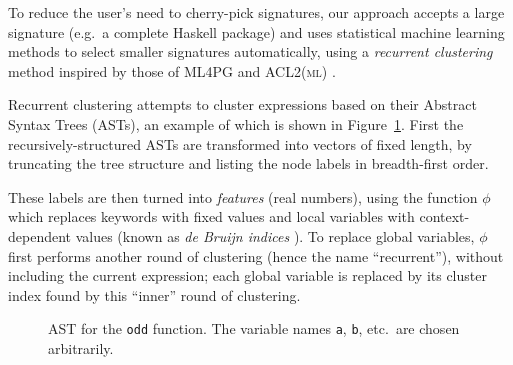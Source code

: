 \documentclass[]{default}
\newcommand{\id}[1]{\texttt{"#1"}}
\newcommand{\CVar}{\texttt{Var}}
\newcommand{\CApp}{\texttt{App}}
\newcommand{\CLam}{\texttt{Lam}}
\newcommand{\CCase}{\texttt{Case}}
\newcommand{\CLocal}{\texttt{Local}}
\newcommand{\CGlobal}{\texttt{Global}}
\newcommand{\CConstructor}{\texttt{Constructor}}
\newcommand{\CAlt}{\texttt{Alt}}
\newcommand{\CDataAlt}{\texttt{DataAlt}}
\begin{document}
To reduce the user's need to cherry-pick signatures, our approach
accepts a large signature (e.g.\ a complete Haskell package) and uses
statistical machine learning methods to select smaller signatures
automatically, using a \emph{recurrent clustering} method inspired by
those of \textsc{ML4PG} \cite{journals/corr/abs-1212-3618} and \textsc{ACL2(ml)} \cite{Heras.Komendantskaya.Johansson.ea:2013}.

Recurrent clustering attempts to cluster expressions based on their
Abstract Syntax Trees (ASTs), an example of which is shown in Figure~\ref{fig:astexample}. First the recursively-structured ASTs are
transformed into vectors of fixed length, by truncating the tree
structure and listing the node labels in breadth-first order.

These labels are then turned into \emph{features} (real numbers), using the function $\phi$ which replaces keywords with fixed values and local variables with context-dependent values (known as \emph{de Bruijn indices} \cite{de1972lambda}). To replace global variables, $\phi$ first performs another round of clustering (hence the name
``recurrent''), without including the current expression; each global
variable is replaced by its cluster index found by this ``inner'' round
of clustering.

\begin{figure}
    \begin{small}
    \end{small}
    \caption{AST for the \texttt{odd} function. The variable names \texttt{a}, \texttt{b}, etc.\ are chosen arbitrarily.}
    \label{fig:astexample}
\end{figure}
\end{document}
